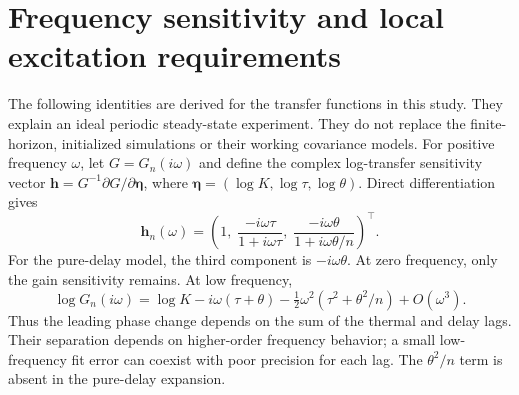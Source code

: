 \section{Frequency sensitivity and local excitation requirements}
\label{sec:frequency-information}
The following identities are derived for the transfer functions in this study.
They explain an ideal periodic steady-state experiment. They do not replace
the finite-horizon, initialized simulations or their working covariance models.
For positive frequency $\omega$, let $G=G_n(i\omega)$ and define the complex
log-transfer sensitivity vector $\bm h=G^{-1}\partial G/\partial\bm\eta$,
where $\bm\eta=(\log K,\log\tau,\log\theta)$. Direct differentiation gives
\begin{equation}
 \bm h_n(\omega)=\left(
 1,\;\frac{-i\omega\tau}{1+i\omega\tau},\;
 \frac{-i\omega\theta}{1+i\omega\theta/n}
 \right)^\top.
 \label{eq:frequency-sensitivities}
\end{equation}
For the pure-delay model, the third component is $-i\omega\theta$.
At zero frequency, only the gain sensitivity remains. At low frequency,
\[
 \log G_n(i\omega)=\log K-i\omega(\tau+\theta)
 -\tfrac12\omega^2(\tau^2+\theta^2/n)+O(\omega^3).
\]
Thus the leading phase change depends on the sum of the thermal and delay
lags. Their separation depends on higher-order frequency behavior; a small
low-frequency fit error can coexist with poor precision for each lag.
The $\theta^2/n$ term is absent in the pure-delay expansion.

